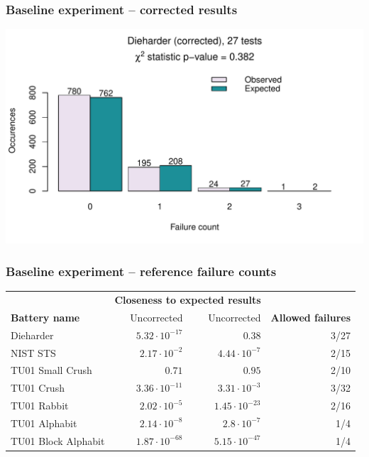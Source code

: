 \documentclass[aspectratio=169]{beamer}
\newcommand{\gr}{\cellcolor{green!40}}
\begin{document}
\begin{frame}
\frametitle{Baseline experiment -- corrected results}
\begin{nomar}
\centering
\includegraphics[width=.85\textwidth]{figures/dieharder-corr.pdf} 
\end{nomar}
\end{frame}

\begin{frame}
\frametitle{Baseline experiment -- reference failure counts}
\begin{table}
\begin{nomar}
\centering
\begin{tabular}{@{}lrrr@{}}
                                                                                                                  \toprule
                      & \multicolumn{2}{c}{\textbf{Closeness to expected results}} &                           \\ \cmidrule(lr){2-3}
\textbf{Battery name} & Uncorrected               & Uncorrected                    & \textbf{Allowed failures} \\ \midrule
Dieharder             &    $5.32 \cdot 10^{-17}$  & \gr$0.38$                      & 3/27                      \\ 
NIST STS              & \gr$2.17 \cdot 10^{-2}$   &    $4.44 \cdot 10^{-7}$        & 2/15                      \\ 
TU01 Small Crush      &    $0.71$                 & \gr$0.95$                      & 2/10                      \\ 
TU01 Crush            &    $3.36 \cdot 10^{-11}$  & \gr$3.31 \cdot 10^{-3}$        & 3/32                      \\ 
TU01 Rabbit           & \gr$2.02 \cdot 10^{-5}$   &    $1.45 \cdot 10^{-23}$       & 2/16                      \\ 
TU01 Alphabit         &    $2.14 \cdot 10^{-8}$   & \gr$2.8 \cdot 10^{-7}$         & 1/4                       \\ 
TU01 Block Alphabit   &    $1.87 \cdot 10^{-68}$  & \gr$5.15 \cdot 10^{-47}$       & 1/4                       \\ \bottomrule
\end{tabular}
\end{nomar}
\end{table}
\end{frame}
\end{document}
